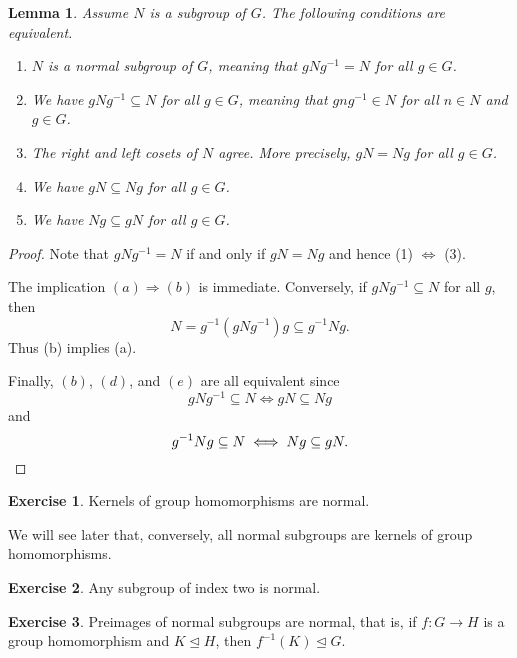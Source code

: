 \documentclass[12pt]{report}
\newtheorem{lemma}[theorem]{Lemma}
\numberwithin{equation}{section}
\numberwithin{theorem}{chapter}
\theoremstyle{definition}
\newtheorem{exercise}{Exercise}
\newtheorem*{basic properties}{Basic Properties}
\newtheorem*{Important Remark}{Important Remark}
\begin{document}
\newpage


\begin{lemma}\label{lem925}\label{normal subgroup equivs}
Assume $N$ is a subgroup of $G$. The following conditions are equivalent. 
\begin{enumerate}[label=(\alph*),leftmargin=20pt,itemsep=0.1em]
\item $N$ is a normal subgroup of $G$, meaning that $gNg^{-1} = N$ for all $g \in G$.
\item We have $gNg^{-1} \subseteq N$ for all $g \in G$, meaning that $gng^{-1} \in N$ for all $n \in N$ and $g \in G$.
\item The right and left cosets of $N$ agree. More precisely, $gN = Ng$ for all $g \in G$. 
\item We have $gN \subseteq Ng$ for all $g \in G$.
\item We have $Ng \subseteq gN$ for all $g \in G$.
\end{enumerate}
\end{lemma}



\begin{proof} 
Note that $gNg^{-1} = N$ if and only if $gN = Ng$ and hence (1) $\iff$ (3).
  
The implication $(a) \Rightarrow (b)$ is immediate. Conversely, if $gNg^{-1} \subseteq N$ for all $g$, then 
$$N = g^{-1}(gNg^{-1})g \subseteq g^{-1}Ng.$$ 
Thus (b) implies (a).

Finally, $(b)$, $(d)$, and $(e)$ are all equivalent since 
$$gNg^{-1} \subseteq N \iff gN \subseteq Ng$$
and
$$g^{-1}Ng \subseteq N \iff Ng \subseteq gN.\qedhere$$
\end{proof}

\begin{exercise}\label{kernel is a normal subgroup}
Kernels of group homomorphisms are normal.
\end{exercise}

We will see later that, conversely, all normal subgroups are kernels of group homomorphisms.

\begin{exercise}\label{index 2 normal}
	Any subgroup of index two is normal.
\end{exercise}


\begin{exercise}\label{preimage of normal subgroup is normal}
Preimages of normal subgroups are normal, that is, if $f:G\to H$ is a group homomorphism and $K\trianglelefteq H$, then $f^{-1}(K)\trianglelefteq G$.	
\end{exercise}
\end{document}
